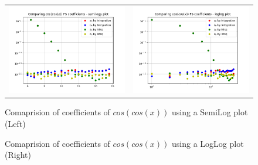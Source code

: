 \documentclass[11pt, a4paper]{article}
\begin{document}
             \begin{figure}[H]
                    \centering
                    \setlength\tabcolsep{2pt}
                    \begin{tabular}{cc}
                       \includegraphics[scale=0.5]{Figure 5.1.png} &
                       \includegraphics[scale=0.5]{Figure 6.1.png}
                    \end{tabular}
                     \caption{Comaprision of coefficients of $cos(cos(x))$ using a SemiLog plot (Left)}
                     \caption{Comaprision of coefficients of $cos(cos(x))$ using a LogLog plot (Right)}
                    \end{figure}        
    
\end{document}
